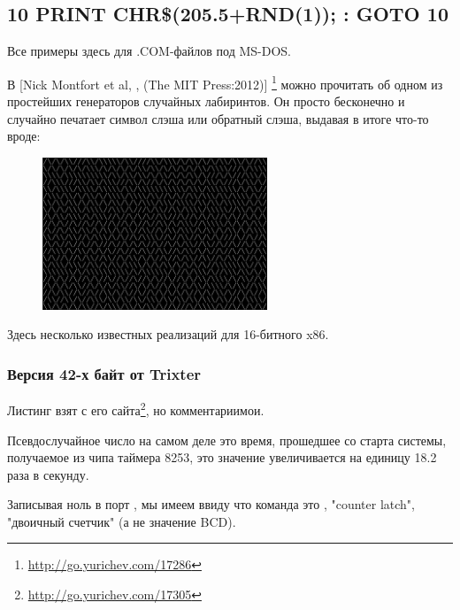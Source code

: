 \subsection{10 PRINT CHR\$(205.5+RND(1)); : GOTO 10}

Все примеры здесь для .COM-файлов под MS-DOS.

В [Nick Montfort et al, , (The MIT Press:2012)]
\footnote{\AlsoAvailableAs \url{http://go.yurichev.com/17286}}
можно прочитать об одном из простейших генераторов случайных лабиринтов.
Он просто бесконечно и случайно печатает символ слэша или обратный слэша, выдавая в итоге что-то вроде:

\begin{figure}[H]
\centering
\includegraphics[width=0.6\textwidth]{examples/demos/10print/10print.png}
\end{figure}

Здесь несколько известных реализаций для 16-битного x86.

\subsubsection{Версия 42-х байт от Trixter}

\newcommand{\FNURLTRIXTER}{\footnote{\url{http://go.yurichev.com/17305}}}

Листинг взят с его сайта\FNURLTRIXTER, но комментарии\EMDASH{}мои.



Псевдослучайное число на самом деле это время, прошедшее со старта системы, получаемое из чипа таймера 8253, 
это значение
увеличивается на единицу 18.2 раза в секунду.

Записывая ноль в порт , 
мы имеем ввиду что команда это , 
"counter latch", 
"двоичный счетчик" (а не значение \ac{BCD}).

